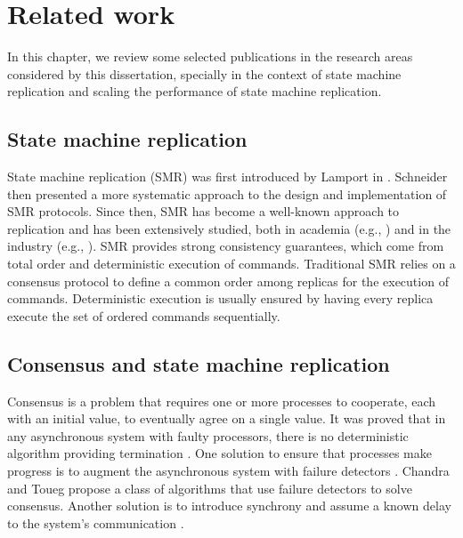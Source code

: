 \chapter[Related work]{Related work}
\label{sec:rw}

In this chapter, we review some selected publications in the research areas considered
by this dissertation, specially in the context of state machine replication and scaling
the performance of state machine replication.

\section{State machine replication}

State machine replication (SMR) was first introduced by Lamport in \cite{Lam78}. Schneider \cite{Sch90} then presented a more systematic
approach to the design and implementation of SMR protocols. Since then, SMR has
become a well-known approach to replication and has been extensively studied,
both in academia (e.g., \cite{Kapritsos:2012um, Kotla:2004ep, santos2013htsmr,
Mencius}) and in the industry (e.g., \cite{corbett2013spanner}). SMR provides strong consistency guarantees, which
come from total order and deterministic execution of commands. Traditional SMR
relies on a consensus protocol to define a common order among replicas for the execution of 
commands. Deterministic execution is usually ensured by having every replica
execute the set of ordered commands sequentially.


\section{Consensus and state machine replication}

Consensus \cite{Lam78, paprzycki:2001distributed} is a problem that requires one
or more processes to cooperate, each with an initial value, to eventually agree on
a single value. It was proved that in any asynchronous system with faulty
processors, there is no deterministic algorithm providing termination
\cite{FLP85}. One solution to ensure that processes make progress is to augment the asynchronous system with failure detectors \cite{aguilera:2000failure}.
Chandra and Toueg \cite{CT96} propose a class of algorithms that use failure
detectors to solve consensus. Another solution is to introduce synchrony and
assume a known delay to the system's communication \cite{Aspnes:2003vp}.

